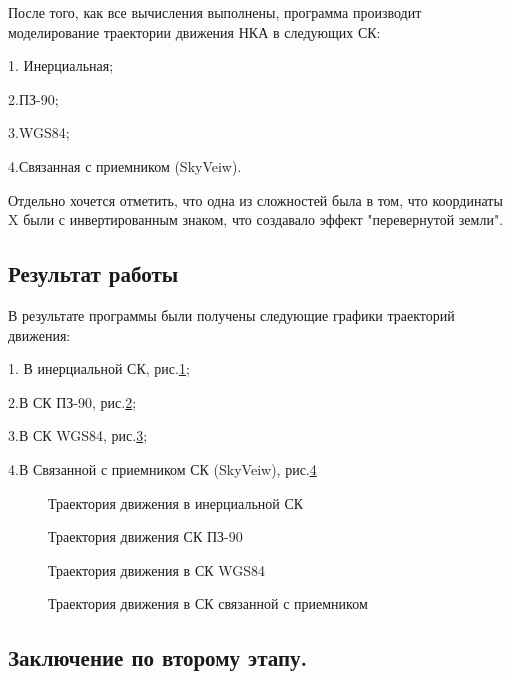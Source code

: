 \documentclass[]{article}
\begin{document}
	
	После того, как все вычисления выполнены, программа производит моделирование траектории движения НКА в следующих СК:
	
	1. Инерциальная;
	
	2.ПЗ-90;
	
	3.WGS84;
	
	4.Связанная с приемником (SkyVeiw).
	
	Отдельно хочется отметить, что одна из сложностей была в том, что координаты X были с инвертированным знаком, что создавало эффект "перевернутой земли".
	
	
	\subsection{Результат работы}
	В результате программы были получены следующие графики траекторий движения:
	
	1. В инерциальной СК, рис.\ref{inertz};
	
	2.В СК ПЗ-90, рис.\ref{PZ};
	
	3.В СК WGS84, рис.\ref{WGS};
	
	4.В Связанной с приемником СК (SkyVeiw), рис.\ref{skyv}
	
	
	
	\begin{figure}[h!]
		
		\caption{Траектория движения в инерциальной СК  }
		\label{inertz}
	\end{figure}
	
	\begin{figure}[h!]
		
		\centering{\texttt{[image: PZ90]}}
		\caption{Траектория движения  СК ПЗ-90 }
		\label{PZ}
	\end{figure}
	
	\begin{figure}[h!]
		
		\caption{Траектория движения в СК WGS84  }
		\label{WGS}
	\end{figure}
	
	\begin{figure}[h!]
		
		\caption{Траектория движения в СК связанной с приемником }
		\label{skyv}
	\end{figure}
	
	\newpage
	\subsection{Заключение по второму этапу.}
	
\end{document}
